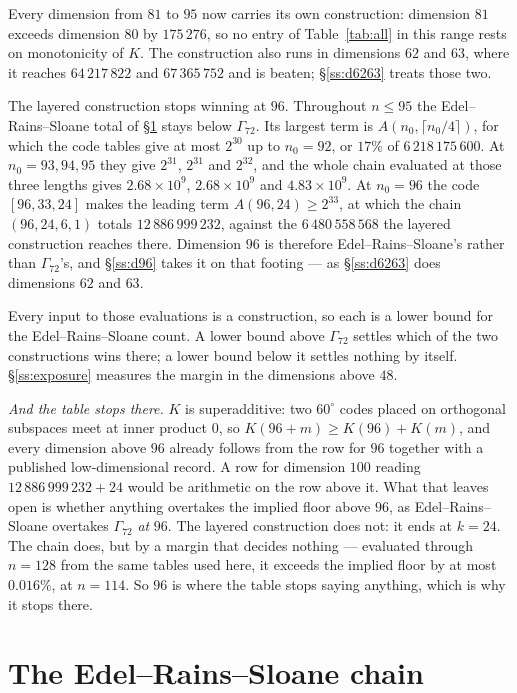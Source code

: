 \documentclass[11pt]{amsart}
\theoremstyle{remark}
\newcommand{\Gsz}{\Gamma_{72}}
\begin{document}
Every dimension from $81$ to $95$ now carries its own construction: dimension $81$
exceeds dimension $80$ by $175\,276$, so no entry of Table~\ref{tab:all} in this
range rests on monotonicity of $K$. The construction also runs in dimensions $62$
and $63$, where it reaches $64\,217\,822$ and $67\,365\,752$ and is beaten;
\S\ref{ss:d6263} treats those two.

The layered construction stops winning at $96$. Throughout $n\le95$ the
Edel--Rains--Sloane total of \S\ref{sec:ers} stays below $\Gsz$. Its largest term
is $A(n_0,\lceil n_0/4\rceil)$, for which the code tables give at most $2^{30}$
up to $n_0=92$, or $17\%$ of $6\,218\,175\,600$. At $n_0=93,94,95$ they give
$2^{31}$, $2^{31}$ and $2^{32}$, and the whole chain evaluated at those three
lengths gives $2.68\times10^9$, $2.68\times10^9$ and $4.83\times10^9$. At $n_0=96$ the
code $[96,33,24]$ makes the leading term $A(96,24)\ge2^{33}$, at which the chain
$(96,24,6,1)$ totals $12\,886\,999\,232$, against the $6\,480\,558\,568$ the
layered construction reaches there. Dimension $96$ is therefore
Edel--Rains--Sloane's rather than $\Gsz$'s, and \S\ref{ss:d96} takes it on that
footing --- as \S\ref{ss:d6263} does dimensions $62$ and $63$.

Every input to those evaluations is a construction, so each is a lower bound for
the Edel--Rains--Sloane count. A lower bound above $\Gsz$ settles which of the
two constructions wins there; a lower bound below it settles nothing by itself.
\S\ref{ss:exposure} measures the margin in the dimensions above $48$.

\emph{And the table stops there.} $K$ is superadditive: two $60^\circ$ codes placed on
orthogonal subspaces meet at inner product $0$, so $K(96+m)\ge K(96)+K(m)$, and every
dimension above $96$ already follows from the row for $96$ together with a published
low-dimensional record. A row for dimension $100$ reading $12\,886\,999\,232+24$ would be
arithmetic on the row above it. What that leaves open is whether anything overtakes the
implied floor above $96$, as Edel--Rains--Sloane overtakes $\Gsz$ \emph{at} $96$. The layered
construction does not: it ends at $k=24$. The chain does, but by a margin that decides
nothing --- evaluated through $n=128$ from the same tables used here, it exceeds the implied
floor by at most $0.016\%$, at $n=114$. So $96$ is where the table stops saying anything, which is why it
stops there.

\section{The Edel--Rains--Sloane chain}\label{sec:ers}
\end{document}
